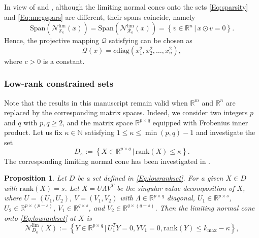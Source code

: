 \documentclass[11pt,a4paper,reqno]{amsart}
\newtheorem{proposition}[theorem]{Proposition}
\begin{document}
{In view of  and , although the limiting normal cones onto the sets \eqref{Eq:sparsity} and \eqref{Eq:nnegspars} are different, their spans coincide, namely 
\begin{equation*}
    \text{Span} \left(\mathcal N^{\text{lim}}_{\mathcal S_{\kappa}}(x) \right)= \text{Span} \left(\mathcal N^{\text{lim}}_{\mathcal R_{\kappa}}(x) \right)=\left\{ v\in \mathbb R^n \,\big|\, x \odot v=0\right\}.
\end{equation*}
Hence, the projective mapping $\mathcal Q$ satisfying  can be chosen as
\begin{equation}\label{Eq:Qsparsity}
    \mathcal Q(x)= c\text{diag}\left(x^2_1, x^2_2, \ldots, x^2_n\right),
\end{equation}
where $c>0$ is a constant.
\subsubsection{Low-rank constrained sets}
Note that the results in this manuscript remain valid when $\mathbb R^m$ and $\mathbb R^n$ are replaced by the corresponding matrix spaces. Indeed, we consider two integers $p$ and $q$ with $p, q \geq 2$, and the matrix space $\mathbb R^{p \times q}$ equipped with Frobenius inner product. Let us fix $\kappa \in \mathbb N$ satisfying $1 \leq \kappa \leq \min(p,q)-1$ and investigate the set
\begin{equation}\label{Eq:lowrankset}
    D_{\kappa}:=\left\{ X \in \mathbb R^{p \times q} \,\big|\, \text{rank} (X) \leq \kappa \right\}.
\end{equation}
The corresponding limiting normal cone has been investigated in \cite{luke2013prox}.
\begin{proposition}\cite[Theorem~3.1]{luke2013prox} \label{Prop:lrlcn}
    Let $D$ be a set defined in \eqref{Eq:lowrankset}. For a given $X\in D$ with $\text{rank}(X)=s$. Let $X=U\Lambda V^T$ be the singular value decomposition of $X$, where $U=(U_1, U_2)$, $V=(V_1, V_2)$ with $\Lambda \in \mathbb R^{p\times q}$ diagonal, $U_1 \in \mathbb R^{p \times s}$,  $U_2 \in \mathbb R^{p \times (p-s)}$, $V_1 \in \mathbb R^{q \times s}$,  and $V_2 \in \mathbb R^{q \times (q-s)}$. Then the limiting normal cone onto \eqref{Eq:lowrankset} at $X$ is
    \begin{equation*}
        \mathcal N_{D_{\kappa}}^{\text{lim}}(X):=\left\{ Y\in \mathbb R^{p\times q} \,\big|\, U_1^TY=0, YV_1=0, \text{rank} (Y) \leq k_{\max} -\kappa\right\},
    \end{equation*}

\end{proposition}}
\end{document}
